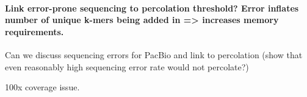 \documentclass[12pt]{article} \usepackage{simplemargins}
\begin{document}
\paragraph{Link error-prone sequencing to percolation threshold?  Error inflates number of unique k-mers being added in => increases memory requirements.}

Can we discuss sequencing errors for PacBio and link to percolation (show
that even reasonably high sequencing error rate would not percolate?)

100x coverage issue.

\begin{figure}
\end{figure}
\end{document}
